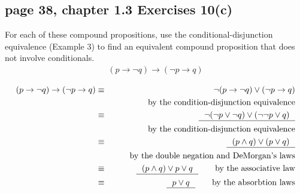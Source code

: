 \documentclass[sigconf]{acmart}
\begin{document}
\subsection{page 38, chapter 1.3 Exercises 10(c)}
\begin{shaded}
    For each of these compound propositions, use the conditional-disjunction equivalence (Example 3) to find an equivalent compound proposition that does not involve conditionals.
    \begin{eqnarray*}
    	(p \rightarrow \neg q) \rightarrow (\neg p \rightarrow q)
    \end{eqnarray*}
\end{shaded}  
\begin{eqnarray*}
	(p \rightarrow \neg q) \rightarrow (\neg p \rightarrow q) 
	& \equiv & \neg (p \rightarrow \neg q) \lor (\neg p \rightarrow q ) \\ & & \text{\qquad by the condition-disjunction equivalence}\\ 
	  & \equiv & \text{\underline{~~$\neg(\neg p \lor \neg q) \lor (\neg \neg p \lor q)$~~}} \\ & & \text{\qquad by the condition-disjunction equivalence}\\  
	  & \equiv & \text{\underline{~~$(p \land q) \lor (p \lor q)$~~}} \\ & & \text{\qquad by the double negation and DeMorgan's laws} \\
	  & \equiv & \text{\underline{~~$(p \land q) \lor p \lor q$~~}} \text{\qquad by the associative law} \\ 
	  & \equiv & \text{\underline{~~$p \lor q$~~}} \text{\qquad by the absorbtion laws}
\end{eqnarray*}
\end{document}
